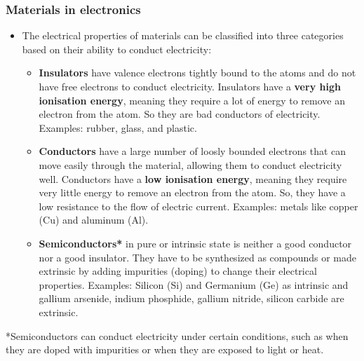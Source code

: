 \begin{frame}
	\frametitle{Materials in electronics}
            \begin{itemize}
                \item The electrical properties of materials can be classified into three categories based on their ability to conduct electricity:
            \begin{itemize}
                \item \textbf{Insulators} have valence electrons tightly bound to the atoms and do not have free electrons to conduct electricity. Insulators have a \textbf{very high ionisation energy}, meaning they require a lot of energy to remove an electron from the atom. So they are bad conductors of electricity. Examples: rubber, glass, and plastic.
                \item \textbf{Conductors} have a large number of loosly bounded electrons that can move easily through the material, allowing them to conduct electricity well. Conductors have a \textbf{low ionisation energy}, meaning they require very little energy to remove an electron from the atom. So, they have a low resistance to the flow of electric current. Examples: metals like copper (Cu) and aluminum (Al).
                \item \textbf{Semiconductors*} in pure or intrinsic state is neither a good conductor nor a good insulator. They have to be synthesized as compounds or made extrinsic by adding impurities (doping) to change their electrical properties. Examples: Silicon (Si) and Germanium (Ge) as intrinsic and gallium arsenide, indium phosphide, gallium nitride, silicon carbide are extrinsic.
            \end{itemize}
            \end{itemize}
            *Semiconductors can conduct electricity under certain conditions, such as when they are doped with impurities or when they are exposed to light or heat.
\end{frame}

